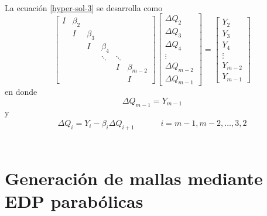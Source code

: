 \documentclass[letterpaper, openright, 12pt]{book}
\begin{document}
	\paragraph*{}
		La ecuación \ref{hyper-sol-3} se desarrolla como
		\begin{equation}
			\begin{bmatrix}
				I & \beta_2\\
				& I & \beta_3\\
				& & I & \beta_4\\
				& & & \ddots & \ddots\\
				& & & & I & \beta_{m-2}\\
				& & & & & I
			\end{bmatrix}
			\begin{bmatrix}
				\Delta Q_2\\
				\Delta Q_3\\
				\Delta Q_4\\
				\vdots\\
				\Delta Q_{m-2}\\
				\Delta Q_{m-1}
			\end{bmatrix}
			=
			\begin{bmatrix}
				Y_2\\
				Y_3\\
				Y_4\\
				\vdots\\
				Y_{m-2}\\
				Y_{m-1}
			\end{bmatrix}
		\end{equation}
		en donde
		\begin{equation}
			\Delta Q_{m-1} = Y_{m-1}
		\end{equation}
		y
		\begin{align}
			\Delta Q_i = Y_i - \beta_i \Delta Q_{i+1} &&&& i = m-1, m-2, \dots, 3, 2
		\end{align}\\
		
		
	\section{Generación de mallas mediante EDP parabólicas}
\end{document}
